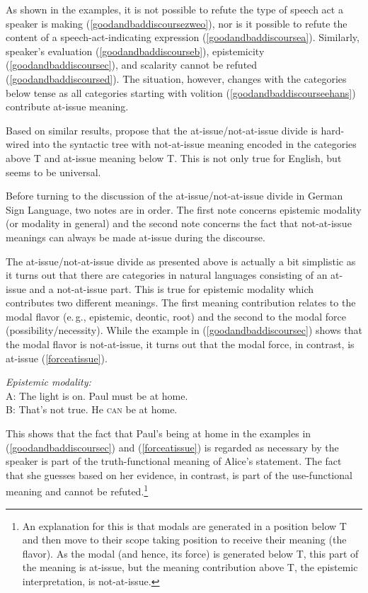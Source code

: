  
\noindent As shown in the examples, it is not possible to refute the type of speech act a speaker is making (\ref{goodandbaddiscoursezweo}), nor is it possible to refute the content of a speech-act-indicating expression (\ref{goodandbaddiscoursea}). Similarly, speaker's evaluation (\ref{goodandbaddiscourseb}), epistemicity (\ref{goodandbaddiscoursec}), and scalarity cannot be refuted (\ref{goodandbaddiscoursed}). The situation, however, changes with the categories below tense as all categories starting with volition (\ref{goodandbaddiscourseehans}) contribute at-issue meaning.

Based on similar results, \citet{bross2017scope} propose that the at-issue/not-at-issue divide is hard-wired into the syntactic tree with not-at-issue meaning encoded in the categories above T and at-issue meaning below T. This is not only true for English, but seems to be universal. 

Before turning to the discussion of the at-issue/not-at-issue divide in German Sign Language, two notes are in order. The first note concerns epistemic modality (or modality in general) and the second note concerns the fact that not-at-issue meanings can always be made at-issue during the discourse.

The at-issue/not-at-issue divide as presented above is actually a bit simplistic as it turns out that there are categories in natural languages consisting of an at-issue and a not-at-issue part. This is true for epistemic modality which contributes two different meanings. The first meaning contribution relates to the modal flavor (e.\,g., epistemic, deontic, root) and the second to the modal force (possibility/necessity). While the example in (\ref{goodandbaddiscoursec}) shows that the modal flavor is not-at-issue, it turns out that the modal force, in contrast, is at-issue (\ref{forceatissue}).

\begin{exe}
\ex \textit{Epistemic modality:}\\ 
A: The light is on. Paul must be at home.\\
B: That's not true. He \textsc{can} be at home.  \label{forceatissue}
\end{exe}

\noindent This shows that the fact that Paul's being at home in the examples in (\ref{goodandbaddiscoursec}) and (\ref{forceatissue}) is regarded as necessary by the speaker is part of the truth-functional meaning of Alice's statement. The fact that she guesses based on her evidence, in contrast, is part of the use-functional meaning and cannot be refuted.\footnote{ An explanation for this is that modals are generated in a position below T and then move to their scope taking position to receive their meaning (the flavor). As the modal (and hence, its force) is generated below T, this part of the meaning is at-issue, but the meaning contribution above T, the epistemic interpretation, is not-at-issue.}

